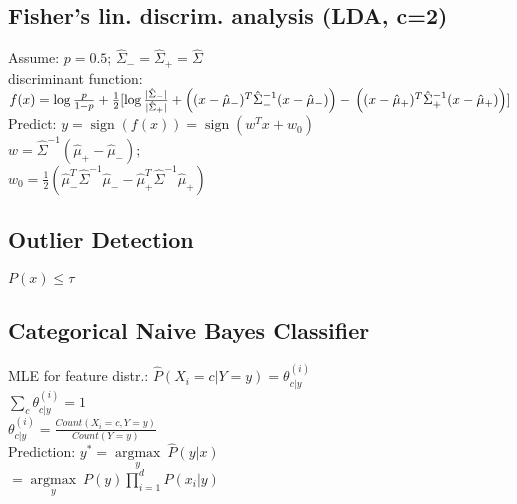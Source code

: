 \subsection*{Fisher's lin. discrim. analysis (LDA, c=2)}
Assume: $p = 0.5$; $\hat{\Sigma}_- = \hat{\Sigma}_+ = \hat{\Sigma}$\\
discriminant function: 
$f(x) = \operatorname{log} \frac{p}{1-p} + \\
\frac{1}{2}[\operatorname{log} \frac{|\hat{\Sigma}_-|}{|\hat{\Sigma}_+|}
+ \left((x - \hat{\mu}_-)^T \hat{\Sigma}_-^{-1} (x - \hat{\mu}_-)\right) - \\
\left((x - \hat{\mu}_+)^T \hat{\Sigma}_+^{-1} (x - \hat{\mu}_+)\right)]$\\
Predict: $y = \operatorname{sign}(f(x)) = \operatorname{sign} (w^T x + w_0)$\\
$w = \hat{\Sigma}^{-1}(\hat{\mu}_+ - \hat{\mu}_-)$; \\
$w_0 = \frac{1}{2}(\hat{\mu}_-^T\hat{\Sigma}^{-1}\hat{\mu}_- - \hat{\mu}_+^T \hat{\Sigma}^{-1}\hat{\mu}_+)$

\subsection*{Outlier Detection}
$P(x) \leq \tau$

\subsection*{Categorical Naive Bayes Classifier}
MLE for feature distr.:
$\hat{P}(X_i = c|Y = y) = \theta_{c|y}^{(i)}$\\
$\sum_{c} \theta_{c|y}^{(i)} = 1$\\
$\theta_{c|y}^{(i)} = \frac{Count(X_i = c, Y = y)}{Count(Y=y)}$\\
Prediction: $y^* = \underset{y}{\operatorname{argmax}}\ \hat{P}(y|x)$\\
$=\underset{y}{\operatorname{argmax}}\ P(y) \prod_{i=1}^d P(x_i | y)$